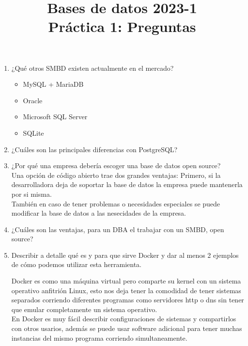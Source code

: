 \documentclass[12pt,a4paper]{article}
\title{Bases de datos 2023-1\\
Práctica 1: Preguntas}
\begin{document}
\maketitle

\begin{enumerate}
	\item ¿Qué otros SMBD existen actualmente en el mercado?\\
		\begin{itemize}
			\item MySQL + MariaDB
			\item Oracle
			\item Microsoft SQL Server
			\item SQLite
		\end{itemize}

	\item ¿Cuáles son las principales diferencias con PostgreSQL?\\

	\item ¿Por qué una empresa debería escoger una base de datos open source?\\
		Una opción de código abierto trae dos grandes ventajas:
		Primero, si la desarrolladora deja de soportar la base de datos la empresa
		puede mantenerla por si misma.\\
		También en caso de tener problemas o necesidades especiales se puede
		modificar la base de datos a las nesecidades de la empresa.\\

	\item ¿Cuáles son las ventajas, para un DBA el trabajar con un SMBD, open source?\\

	\item Describir a detalle qué es y para que sirve Docker y dar al menos 2 ejemplos\\
		de cómo podemos utilizar esta herramienta.

		Docker es como una máquina virtual pero comparte su kernel con un sistema operativo
		anfitrión Linux, esto nos deja tener la comodidad de tener sistemas separados
		corriendo diferentes programas como servidores http o dns sin tener que emular
		completamente un sistema operativo.\\

		En Docker es muy fácil describir configuraciones de sistemas y compartirlos
		con otros usarios, además se puede usar software adicional para tener muchas
		instancias del mismo programa corriendo simultaneamente.\\


\end{enumerate}
\end{document}

